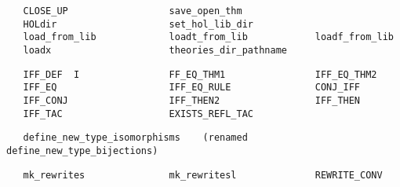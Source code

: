 \begin{hol}\begin{verbatim}
   CLOSE_UP                  save_open_thm
   HOLdir                    set_hol_lib_dir
   load_from_lib             loadt_from_lib            loadf_from_lib
   loadx                     theories_dir_pathname
\end{verbatim}\end{hol}
\begin{hol}\begin{verbatim}
   IFF_DEF  I                FF_EQ_THM1                IFF_EQ_THM2
   IFF_EQ                    IFF_EQ_RULE               CONJ_IFF
   IFF_CONJ                  IFF_THEN2                 IFF_THEN
   IFF_TAC                   EXISTS_REFL_TAC
\end{verbatim}\end{hol}
\begin{hol}\begin{verbatim}
   define_new_type_isomorphisms    (renamed define_new_type_bijections)
\end{verbatim}\end{hol}
\begin{hol}\begin{verbatim}
   mk_rewrites               mk_rewritesl              REWRITE_CONV
\end{verbatim}\end{hol}



